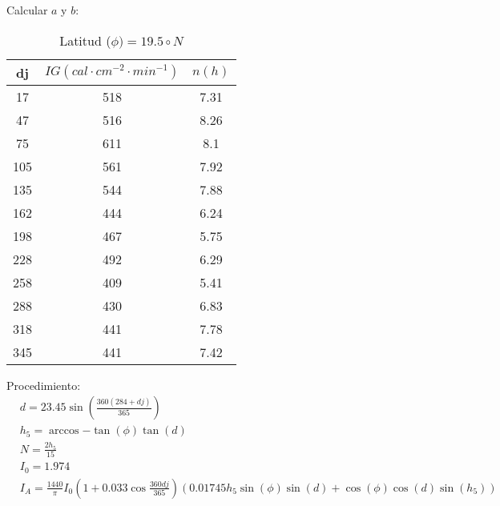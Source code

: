 \begin{example}
    Calcular $a$ y $b$:
    \begin{table}[h!]
        \centering
        \begin{tabular}{@{}ccc@{}}
        \toprule
        dj  & $IG (cal\cdot cm^{-2}\cdot min^{-1})$ & $n (h)$ \\ \midrule
        17  & 518                                   & 7.31    \\
        47  & 516                                   & 8.26    \\
        75  & 611                                   & 8.1     \\
        105 & 561                                   & 7.92    \\
        135 & 544                                   & 7.88    \\
        162 & 444                                   & 6.24    \\
        198 & 467                                   & 5.75    \\
        228 & 492                                   & 6.29    \\
        258 & 409                                   & 5.41    \\
        288 & 430                                   & 6.83    \\
        318 & 441                                   & 7.78    \\
        345 & 441                                   & 7.42    \\ \bottomrule
        \end{tabular}
        \caption{Latitud ($\phi) = 19.5\circ N$}
        \label{tabma9}
\end{table}
\end{example}
Procedimiento:
\begin{align*}
    &d = 23.45\sin{\left(\frac{360(284 +dj)}{365}\right)}\\
    &h_5 = \arccos{ -\tan{(\phi)}\tan{(d)}}\\
    &N =\frac{2h_5}{15}\\
    &I_0= 1.974\\
    &I_A=\frac{1440}{\pi}I_0\left(1 + 0.033\cos{\frac{360dj}{365}}\right)\left(0.01745h_5\sin{(\phi)}\sin{(d)} +\cos{(\phi)}\cos{(d)}\sin{(h_5)}\right)\\
\end{align*}

